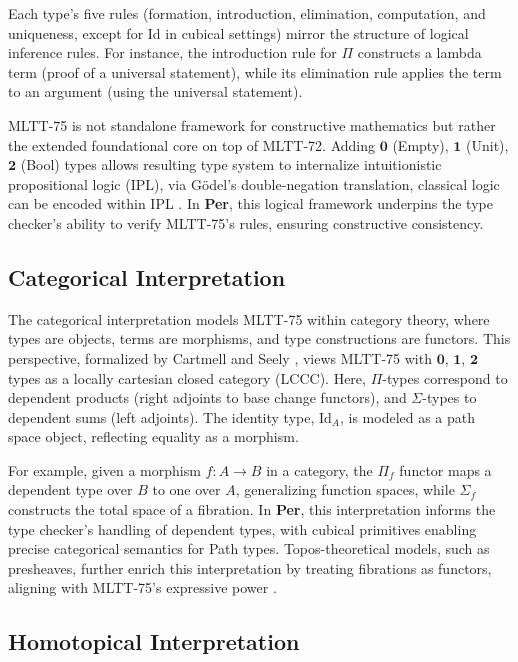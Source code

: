 \documentclass{article}
\begin{document}
Each type’s five rules (formation, introduction, elimination, computation,
and uniqueness, except for Id in cubical settings) mirror the structure
of logical inference rules. For instance, the introduction rule for $\Pi$
constructs a lambda term (proof of a universal statement), while its elimination
rule applies the term to an argument (using the universal statement).

MLTT-75 is not standalone framework for constructive mathematics
but rather the extended foundational core on top of MLTT-72.
Adding $\mathbf{0}$ (Empty), $\mathbf{1}$ (Unit), $\mathbf{2}$ (Bool) types allows
resulting type system to internalize intuitionistic propositional logic (IPL),
via Gödel’s double-negation translation, classical logic can be encoded within IPL \cite{Nordstrom90}.
In \textbf{Per}, this logical framework underpins the type checker’s ability
to verify MLTT-75’s rules, ensuring constructive consistency.

\subsection{Categorical Interpretation}

The categorical interpretation models MLTT-75 within category theory,
where types are objects, terms are morphisms, and type constructions are functors.
This perspective, formalized by Cartmell and Seely \cite{Jacobs99},
views MLTT-75 with $\mathbf{0}$, $\mathbf{1}$, $\mathbf{2}$ types
as a locally cartesian closed category (LCCC). Here, $\Pi$-types
correspond to dependent products (right adjoints to base change functors),
and $\Sigma$-types to dependent sums (left adjoints). The identity
type, $\text{Id}_A$, is modeled as a path space object, reflecting
equality as a morphism.

For example, given a morphism $f : A \to B$ in a category, the $\Pi_f$
functor maps a dependent type over $B$ to one over $A$, generalizing
function spaces, while $\Sigma_f$ constructs the total space of a fibration.
In \textbf{Per}, this interpretation informs the type checker’s handling
of dependent types, with cubical primitives enabling precise categorical
semantics for Path types. Topos-theoretical models, such as presheaves,
further enrich this interpretation by treating fibrations as functors,
aligning with MLTT-75’s expressive power \cite{Curien14}.

\subsection{Homotopical Interpretation}
\end{document}
